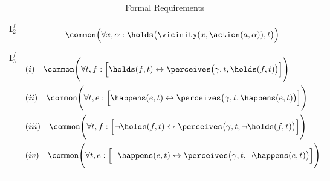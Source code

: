\begin{table}
\begin{small}
\begin{center}
\begin{tabular}{lp{12cm}}
$\mathbf{I}^f_2$ &         \begin{equation*}
          \common\Big(\forall x, \alpha:  \holds\big(\vicinity(x, \action(a, \alpha)), t\big)\Big)
        \end{equation*}
\\
\midrule

$\mathbf{I}^f_3$ &         \begin{equation*}
          \begin{aligned}
       &  (i) \hspace{10pt}  \common\Bigg(\forall  t, f:  \Big[\holds(f, t) \leftrightarrow \perceives\big(\gamma, t, \holds(f, t)\big) \Big]\Bigg)\\
       & (ii)  \hspace{10pt}   \common\Bigg(\forall  t, e: \Big[\happens(e, t)
            \leftrightarrow \perceives\big(\gamma, t, \happens(e,
            t)\big) \Big]\Bigg)\\
        &   (iii)  \hspace{10pt}   \common\Bigg(\forall  t, f:  \Big[\lnot \holds(f, t)
            \leftrightarrow \perceives\big(\gamma, t, \lnot \holds(f, t)\big) \Big]\Bigg)\\
        &   (iv) \hspace{10pt}    \common\Bigg(\forall  t, e:\Big[\lnot \happens(e, t)
            \leftrightarrow \perceives\big(\gamma, t, \lnot \happens(e, t)\big) \Big]\Bigg)
          \end{aligned}
        \end{equation*}
\\
\bottomrule
\end{tabular}
\caption{Formal Requirements}
\label{formalreqs}
\end{center}
\end{small}
\end{table}


